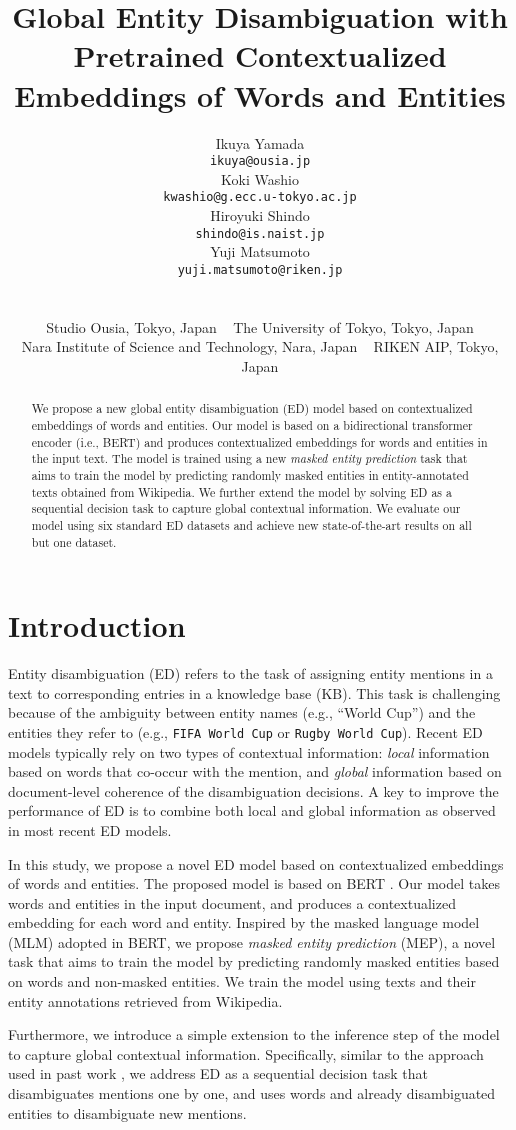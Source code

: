 \documentclass[11pt,a4paper]{article}
\title{Global Entity Disambiguation with Pretrained Contextualized Embeddings of Words and Entities}
\author{
    \begin{minipage}{8em}
        \begin{center}
			Ikuya Yamada\\
			{\tt \fontsize{7.5pt}{0pt}\selectfont ikuya@ousia.jp}
		\end{center}
	\end{minipage}
    \begin{minipage}{11em}
        \begin{center}
			Koki Washio\\
			{\tt \fontsize{7.5pt}{0pt}\selectfont kwashio@g.ecc.u-tokyo.ac.jp}
		\end{center}
	\end{minipage}
	\begin{minipage}{8.5em}
        \begin{center}
			Hiroyuki Shindo\\
			{\tt \fontsize{7.5pt}{0pt}\selectfont shindo@is.naist.jp}
		\end{center}
	\end{minipage}
	\begin{minipage}{8em}
        \begin{center}
			Yuji Matsumoto\\
			{\tt \fontsize{7.5pt}{0pt}\selectfont yuji.matsumoto@riken.jp}
		\end{center}
	\end{minipage}
	\\
	\\
  \fontsize{12pt}{0pt}\selectfont
  Studio Ousia, Tokyo, Japan
  \,\,\,
  The University of Tokyo, Tokyo, Japan\\
  \fontsize{12pt}{0pt}\selectfont
  Nara Institute of Science and Technology, Nara, Japan
  \,\,\,
  RIKEN AIP, Tokyo, Japan
}
\date{}
\begin{document}
\maketitle
\begin{abstract}
  We propose a new global entity disambiguation (ED) model based on contextualized embeddings of words and entities.
  Our model is based on a bidirectional transformer encoder (i.e., BERT) and produces contextualized embeddings for words and entities in the input text.
  The model is trained using a new \textit{masked entity prediction} task that aims to train the model by predicting randomly masked entities in entity-annotated texts obtained from Wikipedia.
  We further extend the model by solving ED as a sequential decision task to capture global contextual information.
  We evaluate our model using six standard ED datasets and achieve new state-of-the-art results on all but one dataset.
\end{abstract}

\section{Introduction}
Entity disambiguation (ED) refers to the task of assigning entity mentions in a text to corresponding entries in a knowledge base (KB).
This task is challenging because of the ambiguity between entity names (e.g., ``World Cup'') and the entities they refer to (e.g., \texttt{FIFA World Cup} or \texttt{Rugby World Cup}).
Recent ED models typically rely on two types of contextual information: \textit{local} information based on words that co-occur with the mention, and \textit{global} information based on document-level coherence of the disambiguation decisions.
A key to improve the performance of ED is to combine both local and global information as observed in most recent ED models.

In this study, we propose a novel ED model based on contextualized embeddings of words and entities.
The proposed model is based on BERT \cite{devlin2018bert}.
Our model takes words and entities in the input document, and produces a contextualized embedding for each word and entity.
Inspired by the masked language model (MLM) adopted in BERT, we propose \textit{masked entity prediction} (MEP), a novel task that aims to train the model by predicting randomly masked entities based on words and non-masked entities.
We train the model using texts and their entity annotations retrieved from Wikipedia.

Furthermore, we introduce a simple extension to the inference step of the model to capture global contextual information.
Specifically, similar to the approach used in past work \cite{Fang:2019:JEL:3308558.3313517,yang2019learning}, we address ED as a sequential decision task that disambiguates mentions one by one, and uses words and already disambiguated entities to disambiguate new mentions.
\end{document}

